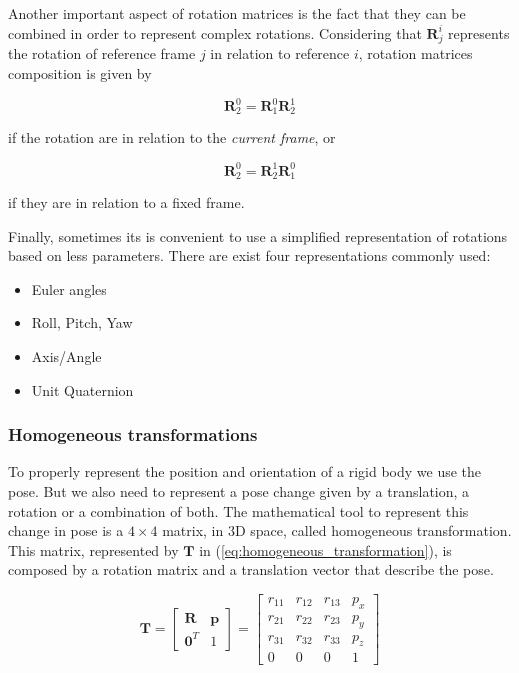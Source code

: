 Another important aspect of rotation matrices is the fact that they can be combined in order to represent complex rotations. Considering that $\boldsymbol{R}^{i}_{j}$ represents the rotation of reference frame $j$ in relation to reference $i$, rotation matrices composition is given by

\begin{equation}
    \boldsymbol{R}^{0}_{2} = \boldsymbol{R}^{0}_{1}\boldsymbol{R}^{1}_{2}
\end{equation}

if the rotation are in relation to the \emph{current frame}, or

\begin{equation}
    \boldsymbol{R}^{0}_{2} = \boldsymbol{R}^{1}_{2}\boldsymbol{R}^{0}_{1}
\end{equation}

if they are in relation to a fixed frame.

Finally, sometimes its is convenient to use a simplified representation of rotations based on less parameters. There are exist four representations commonly used:

\begin{itemize}
    \item Euler angles
    \item Roll, Pitch, Yaw
    \item Axis/Angle
    \item Unit Quaternion
\end{itemize}


\subsubsection{Homogeneous transformations}
\label{subsubsec:homogeneous_transformations}

To properly represent the position and orientation of a rigid body we use the pose. But we also need to represent a pose change given by a translation, a rotation or a combination of both. The mathematical tool to represent this change in pose is a $4\times4$ matrix, in 3D space, called homogeneous transformation. This matrix, represented by $\boldsymbol{T}$ in (\ref{eq:homogeneous_transformation}), is composed by a rotation matrix and a translation vector that describe the pose.

\begin{equation}
    \label{eq:homogeneous_transformation}
    \boldsymbol{T} = \begin{bmatrix} \boldsymbol{R} & \boldsymbol{p} \\ 
    \boldsymbol{0}^{T} & 1\end{bmatrix} = \begin{bmatrix} r_{11} & r_{12} & r_{13} & p_x\\
    r_{21} & r_{22} & r_{23} & p_y\\
    r_{31} & r_{32} & r_{33} & p_z\\
    0 & 0 & 0 & 1\end{bmatrix}
\end{equation}

